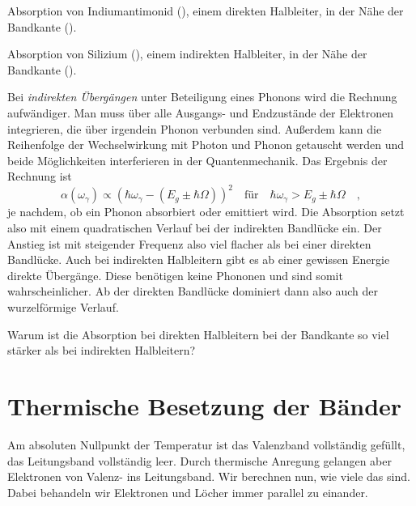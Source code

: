 \begin{marginfigure}[-170mm]
    \caption{Absorption von Indiumantimonid (), einem direkten Halbleiter, in der Nähe der Bandkante (\cite{Johnson1967}).}
\end{marginfigure}

\begin{marginfigure}[-50mm]
    \caption{Absorption von Silizium (), einem indirekten Halbleiter, in der Nähe der Bandkante (\cite{Macfarlane1955}).}
\end{marginfigure}


Bei \emph{indirekten Übergängen} unter Beteiligung eines Phonons wird die Rechnung aufwändiger. Man muss über alle Ausgangs- und Endzustände der Elektronen integrieren, die über irgendein Phonon verbunden sind.  Außerdem kann die Reihenfolge der Wechselwirkung mit Photon und Phonon getauscht werden und beide Möglichkeiten interferieren in der Quantenmechanik. Das Ergebnis der Rechnung ist 
\begin{equation}
    \alpha(\omega_\gamma) \propto \left( \hbar \omega_\gamma -( E_g  \pm \hbar \Omega) \right)^2 \quad \text{für} \quad 
    \hbar \omega_\gamma >  E_g  \pm \hbar \Omega \quad ,
\end{equation}
je nachdem, ob ein Phonon absorbiert oder emittiert wird.
Die Absorption setzt also mit einem quadratischen Verlauf bei der indirekten Bandlücke ein. Der Anstieg ist mit steigender Frequenz also viel flacher als bei einer direkten Bandlücke. Auch bei indirekten Halbleitern gibt es ab einer gewissen Energie direkte Übergänge. Diese benötigen keine Phononen und sind somit wahrscheinlicher. Ab der direkten Bandlücke dominiert dann also auch der wurzelförmige Verlauf.



\begin{questions}
    \item Warum ist die Absorption bei direkten Halbleitern bei der Bandkante so viel stärker als bei indirekten Halbleitern?
\end{questions}


\section{Thermische Besetzung der Bänder}

Am absoluten Nullpunkt der Temperatur ist das Valenzband vollständig gefüllt, das Leitungsband vollständig leer. Durch thermische Anregung gelangen aber Elektronen von Valenz- ins Leitungsband. Wir berechnen nun, wie viele das sind. Dabei behandeln wir Elektronen und Löcher immer parallel zu einander.

